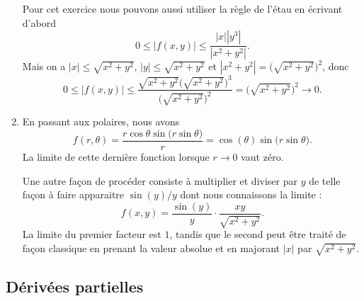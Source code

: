 \begin{example}
\begin{enumerate}
			Pour cet exercice nous pouvons aussi utiliser la règle de l'étau en écrivant d'abord
			\begin{equation}
				0\leq | f(x,y) |\leq\frac{ | x | |y^3 | }{ | x^2+y^2 | }.
			\end{equation}
			Mais on a $| x |\leq\sqrt{x^2+y^2}$, $| y |\leq\sqrt{x^2+y^2}$ et $| x^2+y^2 |=\big( \sqrt{x^2+y^2} \big)^2$, donc
			\begin{equation}
				0\leq| f(x,y) |\leq \frac{ \sqrt{x^2+y^2}\big( \sqrt{x^2+y^2} \big)^3 }{ \big( \sqrt{x^2+y^2} \big)^2 }=\big( \sqrt{x^2+y^2} \big)^2\to 0.
			\end{equation}

		\item
			En passant aux polaires, nous avons
			\begin{equation}
				f(r,\theta)=\frac{ r\cos\theta\sin\big( r\sin\theta \big) }{ r }=\cos(\theta)\sin\big( r\sin\theta \big).
			\end{equation}
			La limite de cette dernière fonction lorsque $r\to 0$ vaut zéro.

			Une autre façon de procéder consiste à multiplier et diviser par $y$ de telle façon à faire apparaitre $\sin(y)/y$ dont nous connaissons la limite :
			\begin{equation}
				f(x,y)=\frac{ \sin(y) }{ y }\cdot\frac{ xy }{ \sqrt{x^2+y^2} }.
			\end{equation}
			La limite du premier facteur est $1$, tandis que le second peut être traité de façon classique en prenant la valeur absolue et en majorant $| x |$ par $\sqrt{x^2+y^2}$.
			
	\end{enumerate}


\end{example}


\subsection{Dérivées partielles}

